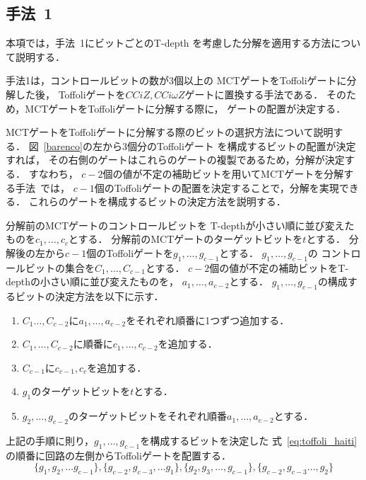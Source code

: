 \subsection{手法~1}
本項では，手法~1にビットごとのT-depth
を考慮した分解を適用する方法について説明する．
\par
手法1は，コントロールビットの数が3個以上の
MCTゲートをToffoliゲートに分解した後，
Toffoliゲートを$CCiZ, CCi\omega Z$ゲートに置換する手法である．
そのため，MCTゲートをToffoliゲートに分解する際に，
ゲートの配置が決定する．
\par
MCTゲートをToffoliゲートに分解する際のビットの選択方法について説明する．
図~\ref{barenco}の左から3個分のToffoliゲート
を構成するビットの配置が決定すれば，
その右側のゲートはこれらのゲートの複製であるため，分解が決定する．
すなわち，
$c-2$個の値が不定の補助ビットを用いてMCTゲートを分解する手法~\cite{barenco1995elementary}では，
$c-1$個のToffoliゲートの配置を決定することで，分解を実現できる．
これらのゲートを構成するビットの決定方法を説明する．
\par
分解前のMCTゲートのコントロールビットを
T-depthが小さい順に並び変えたものを$c_{1},\dots, c_{c}$とする．
分解前のMCTゲートのターゲットビットを$t$とする．
分解後の左から$c-1$個のToffoliゲートを$g_{1},\dots ,g_{c-1}$とする．
$g_{1},\dots, g_{c-1}$の
コントロールビットの集合を$C_{1},\dots, C_{c-1}$とする．
$c-2$個の値が不定の補助ビットをT-depthの小さい順に並び変えたものを，
$a_{1},\dots ,a_{c-2}$とする．
$g_{1},\dots ,g_{c-1}$の構成するビットの決定方法を以下に示す．
\begin{enumerate}[手順1]
  \item $C_{1}\dots, C_{c-2}$に$a_{1},\dots, a_{c-2}$をそれぞれ順番に1つずつ追加する．
  \item $C_{1},\dots ,C_{c-2}$に順番に$c_{1},\dots ,c_{c-2}$を追加する．
  \item $C_{c-1}$に$c_{c-1}, c_{c}$を追加する．
  \item $g_{1}$のターゲットビットを$t$とする．
  \item $g_{2},\dots, g_{c-2}$のターゲットビットをそれぞれ順番$a_{1}, \dots , a_{c-2}$とする．
\end{enumerate}
\par
上記の手順に則り，$g_{1},\dots ,g_{c-1}$を構成するビットを決定した
式~\ref{eq:toffoli_haiti}の順番に回路の左側からToffoliゲートを配置する．
\begin{equation}\label{eq:toffoli_haiti}
  \{g_{1}, g_{2}, \dots g_{c-1}\}, \{g_{c-2},g_{c-3},\dots g_{1}\}, \{g_{2},g_{3},\dots ,g_{c-1}\}, \{g_{c-2}, g_{c-3}\dots ,g_{2}\}
\end{equation}
